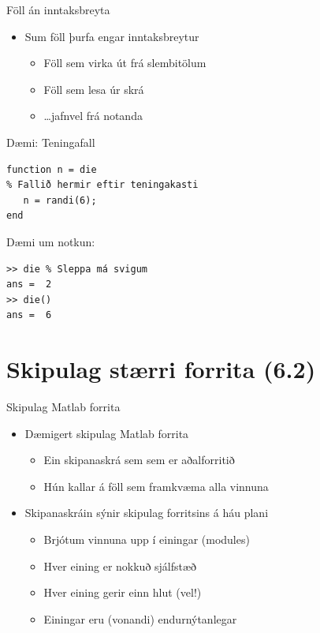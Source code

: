 \documentclass[handout]{beamer}
\begin{document}
\begin{frame}{Föll án inntaksbreyta}
\begin{itemize}
 \item Sum föll þurfa engar inntaksbreytur
 \begin{itemize}
  \item Föll sem virka út frá slembitölum
  \item Föll sem lesa úr skrá
  \pause
  \item \ldots jafnvel frá notanda
 \end{itemize}
\end{itemize}
\end{frame}

\begin{frame}[fragile]{Dæmi: Teningafall}
\begin{verbatim}
function n = die
% Fallið hermir eftir teningakasti
   n = randi(6);
end
\end{verbatim}
Dæmi um notkun:
\begin{verbatim}
>> die % Sleppa má svigum
ans =  2
>> die()
ans =  6
\end{verbatim}

\end{frame}

\section{Skipulag stærri forrita (6.2)}

\begin{frame}{Skipulag Matlab forrita}
\begin{itemize}
 \item Dæmigert skipulag Matlab forrita
 \begin{itemize}
  \item Ein skipanaskrá sem sem er aðalforritið
  \item Hún kallar á föll sem framkvæma alla vinnuna
 \end{itemize}
 \item Skipanaskráin sýnir skipulag forritsins á háu plani
 \begin{itemize}
  \item Brjótum vinnuna upp í einingar (modules)
  \item Hver eining er nokkuð sjálfstæð
  \item Hver eining gerir einn hlut (vel!)
  \item Einingar eru (vonandi) endurnýtanlegar
 \end{itemize}
\end{itemize}
\end{frame}
\end{document}
